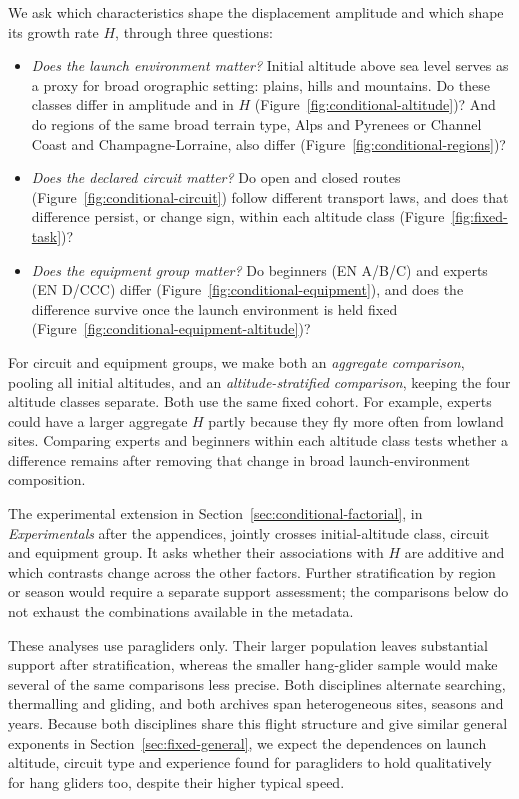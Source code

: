 We ask which characteristics shape the displacement amplitude and which shape
its growth rate $H$, through three questions:
\begin{itemize}
 \item \emph{Does the launch environment matter?} Initial altitude above sea level
 serves as a proxy for broad orographic setting: plains, hills and mountains. Do
 these classes differ in amplitude and in $H$
 (Figure~\ref{fig:conditional-altitude})? And do regions of the same broad terrain
 type, Alps and Pyrenees or Channel Coast and Champagne-Lorraine, also differ
 (Figure~\ref{fig:conditional-regions})?
 \item \emph{Does the declared circuit matter?} Do open and closed routes
 (Figure~\ref{fig:conditional-circuit}) follow different transport laws, and does
 that difference persist, or change sign, within each altitude class
 (Figure~\ref{fig:fixed-task})?
 \item \emph{Does the equipment group matter?} Do beginners (EN A/B/C) and experts
 (EN D/CCC) differ (Figure~\ref{fig:conditional-equipment}), and does the
 difference survive once the launch environment is held fixed
 (Figure~\ref{fig:conditional-equipment-altitude})?
\end{itemize}
For circuit and equipment groups, we make both an \emph{aggregate comparison},
pooling all initial altitudes, and an \emph{altitude-stratified comparison},
keeping the four altitude classes separate. Both use the same fixed cohort.
For example, experts could have a larger aggregate $H$ partly because they fly
more often from lowland sites. Comparing experts and beginners within each
altitude class tests whether a difference remains after removing that change
in broad launch-environment composition.

The experimental extension in Section~\ref{sec:conditional-factorial},
in \emph{Experimentals} after the appendices, jointly crosses initial-altitude
class, circuit and equipment group. It asks
whether their associations with $H$ are additive and which contrasts change
across the other factors. Further stratification by region or season would
require a separate support assessment; the comparisons below do not exhaust
the combinations available in the metadata.

These analyses use paragliders only. Their larger population leaves substantial
support after stratification, whereas the smaller hang-glider sample would make
several of the same comparisons less precise. Both disciplines alternate searching,
thermalling and gliding, and both archives span heterogeneous sites, seasons and
years. Because both disciplines share this flight structure and give similar general
exponents in Section~\ref{sec:fixed-general}, we expect the dependences on
launch altitude, circuit type and experience found for paragliders to hold
qualitatively for hang gliders too, despite their higher typical speed. 

